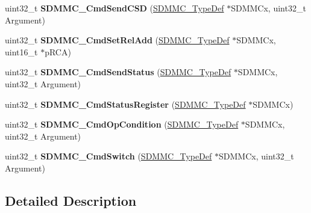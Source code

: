 \begin{DoxyCompactItemize}
\item 
\mbox{\label{group___h_a_l___s_d_m_m_c___l_l___group3_gac73f453dad10a5e84170f92bbb0f5732}} 
uint32\+\_\+t {\bfseries S\+D\+M\+M\+C\+\_\+\+Cmd\+Send\+C\+SD} (\mbox{\hyperlink{struct_s_d_m_m_c___type_def}{S\+D\+M\+M\+C\+\_\+\+Type\+Def}} $\ast$S\+D\+M\+M\+Cx, uint32\+\_\+t Argument)
\item 
\mbox{\label{group___h_a_l___s_d_m_m_c___l_l___group3_gad446d424010e01e1f900f9f082f15a3d}} 
uint32\+\_\+t {\bfseries S\+D\+M\+M\+C\+\_\+\+Cmd\+Set\+Rel\+Add} (\mbox{\hyperlink{struct_s_d_m_m_c___type_def}{S\+D\+M\+M\+C\+\_\+\+Type\+Def}} $\ast$S\+D\+M\+M\+Cx, uint16\+\_\+t $\ast$p\+R\+CA)
\item 
\mbox{\label{group___h_a_l___s_d_m_m_c___l_l___group3_ga718dc39e43910436ed53c91c57e417ea}} 
uint32\+\_\+t {\bfseries S\+D\+M\+M\+C\+\_\+\+Cmd\+Send\+Status} (\mbox{\hyperlink{struct_s_d_m_m_c___type_def}{S\+D\+M\+M\+C\+\_\+\+Type\+Def}} $\ast$S\+D\+M\+M\+Cx, uint32\+\_\+t Argument)
\item 
\mbox{\label{group___h_a_l___s_d_m_m_c___l_l___group3_gadee0cd7240e3bcf3da67a023d3067831}} 
uint32\+\_\+t {\bfseries S\+D\+M\+M\+C\+\_\+\+Cmd\+Status\+Register} (\mbox{\hyperlink{struct_s_d_m_m_c___type_def}{S\+D\+M\+M\+C\+\_\+\+Type\+Def}} $\ast$S\+D\+M\+M\+Cx)
\item 
\mbox{\label{group___h_a_l___s_d_m_m_c___l_l___group3_gac3ec2067a6436dbf994ce269baf0e978}} 
uint32\+\_\+t {\bfseries S\+D\+M\+M\+C\+\_\+\+Cmd\+Op\+Condition} (\mbox{\hyperlink{struct_s_d_m_m_c___type_def}{S\+D\+M\+M\+C\+\_\+\+Type\+Def}} $\ast$S\+D\+M\+M\+Cx, uint32\+\_\+t Argument)
\item 
\mbox{\label{group___h_a_l___s_d_m_m_c___l_l___group3_gae356a832780a8bdbdff101497c11d44b}} 
uint32\+\_\+t {\bfseries S\+D\+M\+M\+C\+\_\+\+Cmd\+Switch} (\mbox{\hyperlink{struct_s_d_m_m_c___type_def}{S\+D\+M\+M\+C\+\_\+\+Type\+Def}} $\ast$S\+D\+M\+M\+Cx, uint32\+\_\+t Argument)
\end{DoxyCompactItemize}


\subsection{Detailed Description}
